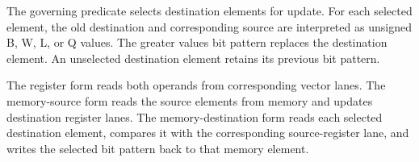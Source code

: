 The governing predicate selects destination elements for update. For each
selected element, the old destination and corresponding source are interpreted
as unsigned B, W, L, or Q values. The greater value\textquotesingle{}s bit pattern replaces the
destination element. An unselected destination element retains its previous bit
pattern.

The register form reads both operands from corresponding vector lanes. The
memory-source form reads the source elements from memory and updates destination
register lanes. The memory-destination form reads each selected destination
element, compares it with the corresponding source-register lane, and writes
the selected bit pattern back to that memory element.
